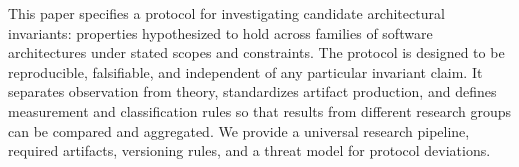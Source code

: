 This paper specifies a protocol for investigating candidate architectural invariants: properties hypothesized to hold across families of software architectures under stated scopes and constraints. The protocol is designed to be reproducible, falsifiable, and independent of any particular invariant claim. It separates observation from theory, standardizes artifact production, and defines measurement and classification rules so that results from different research groups can be compared and aggregated. We provide a universal research pipeline, required artifacts, versioning rules, and a threat model for protocol deviations.